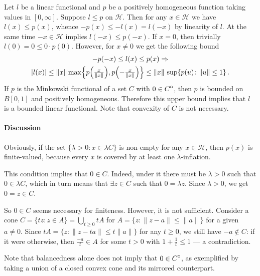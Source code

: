 \documentclass[a4paper]{article}
\newcommand{\Hcal}{\mathcal{H}}
\newcommand{\real}{\mathbb{R}}
\newcommand{\interior}[1]{%
  {\kern0pt#1}^{\mathrm{o}}%
}
\begin{document}
Let $l$ be a linear functional and $p$ be a positively homogeneous function taking
values in $[0, \infty]$. Suppose $l \leq p$ on $\Hcal$. Then for any $x\in \Hcal$ we
have $l(x) \leq p(x)$, whence $- p(x) \leq - l(x) = l(- x)$ by linearity of $l$. At
the same time $- x \in \Hcal$ implies $l(- x) \leq p(- x)$. If $x=0$, then trivially
$l(0) = 0 \leq 0 \cdot p(0)$. However, for $x\neq 0$ we get the following bound
\begin{multline*}
  - p(- x) \leq l(x) \leq p(x)
  \Rightarrow
    \\
    \lvert l(x) \rvert
      \leq \| x \| \max\Bigl\{
          p\Bigl(\tfrac{x}{\|x\|}\Bigr),
          p\Bigl(- \tfrac{x}{\|x\|}\Bigr)
        \Bigr\}
      \leq \|x\| \, \sup\{p(u)\colon \|u\|\leq 1\}
    \,.
\end{multline*}
If $p$ is the Minkowski functional of a set $C$ with $0\in \interior{C}$, then $p$
is bounded on $B[0, 1]$ and positively homogeneous. Therefore this upper bound implies
that $l$ is a bounded linear functional. Note that convexity of $C$ is not necessary.


\paragraph{Discussion} %
\label{par:discussion}

Obviously, if the set $\{ \lambda > 0 \colon x \in \lambda C \}$ is non-empty for
any $x \in \Hcal$, then $p(x)$ is finite-valued, because every $x$ is covered by
at least one $\lambda$-inflation.

This condition implies that $0 \in C$. Indeed, under it there must be $\lambda > 0$
such that $0 \in \lambda C$, which in turn means that $\exists z\in C$ such that
$0 = \lambda z$. Since $\lambda > 0$, we get $0 = z\in C$.

So $0 \in C$ seems necessary for finiteness. However, it is not sufficient. Consider
a cone $C = \{t z\colon z\in A\} = \bigcup_{t\geq 0} t A$ for $A = \{z\colon \|z - a\|
\leq \|a\|\}$ for a given $a \neq 0$. Since $t A = \{z\colon \|z - t a\| \leq t \|a\| \}$
for any $t\geq 0$, we still have $-a \notin C$: if it were otherwise, then $\tfrac{- a}t
\in A$ for some $t > 0$ with $1 + \tfrac1t \leq 1$ --- a contradiction.

Note that balancedness alone does not imply that $0 \in \interior{C}$, as exemplified
by taking a union of a closed convex cone and its mirrored counterpart.
\end{document}
